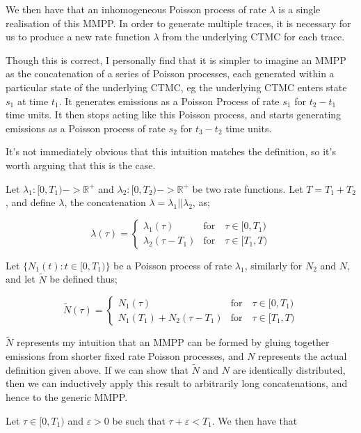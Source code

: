We then have that an inhomogeneous Poisson process of rate $\lambda$ is a single realisation of this MMPP. In order to generate multiple traces, it is necessary for us to produce a new rate function $\lambda$ from the underlying CTMC for each trace.

Though this is correct, I personally find that it is simpler to imagine an MMPP as the concatenation of a series of Poisson processes, each generated within a particular state of the underlying CTMC, eg the underlying CTMC enters state $s_1$ at time $t_1$. It generates emissions as a Poisson Process of rate $s_1$ for $t_2-t_1$ time units. It then stops acting like this Poisson process, and starts generating emissions as a Poisson process of rate $s_2$ for $t_3-t_2$ time units.

It's not immediately obvious that this intuition matches the definition, so it's worth arguing that this is the case.

Let $\lambda_1: [0,T_1) -> \mathbb{R}^{+}$ and $\lambda_2:[0,T_2) -> \mathbb{R}^{+}$ be two rate functions. Let $T = T_1 + T_2$, and define $\lambda$, the concatenation $\lambda = \lambda_1 || \lambda_2$, as;

$$
\lambda(\tau) = 
\begin{cases}
	\lambda_1(\tau) & \mbox{for} \quad \tau \in [0,T_1)\\
	\lambda_2(\tau-T_1) & \mbox{for} \quad \tau \in [T_1,T)
\end{cases}
$$

Let $\{N_1(t) : t \in [0,T_1)\}$ be a Poisson process of rate $\lambda_1$, similarly for $N_2$ and $N$, and let $\widetilde{N}$ be defined thus;

$$
\widetilde{N}(\tau) = 
\begin{cases}
	N_1(\tau) & \mbox{for} \quad \tau \in [0,T_1)\\
	N_1(T_1) + N_2(\tau-T_1) & \mbox{for} \quad \tau \in [T_1,T)
\end{cases}
$$

$\widetilde{N}$ represents my intuition that an MMPP can be formed by gluing together emissions from shorter fixed rate Poisson processes, and $N$ represents the actual definition given above. If we can show that $\widetilde{N}$ and $N$ are identically distributed, then we can inductively apply this result to arbitrarily long concatenations, and hence to the generic MMPP.

Let $\tau \in [0,T_1)$ and $\varepsilon>0$ be such that $\tau + \varepsilon < T_1$. We then have that

